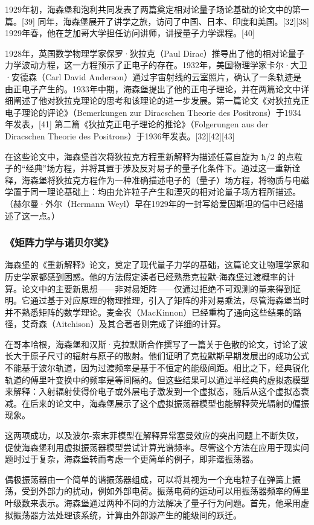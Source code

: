 1929年初，海森堡和泡利共同发表了两篇奠定相对论量子场论基础的论文中的第一篇。[39] 同年，海森堡展开了讲学之旅，访问了中国、日本、印度和美国。[32][38] 1929年春，他在芝加哥大学担任访问讲师，讲授量子力学课程。[40]  

1928年，英国数学物理学家保罗·狄拉克（Paul Dirac）推导出了他的相对论量子力学波动方程，这一方程预示了正电子的存在。1932年，美国物理学家卡尔·大卫·安德森（Carl David Anderson）通过宇宙射线的云室照片，确认了一条轨迹是由正电子产生的。1933年中期，海森堡提出了他的正电子理论，并在两篇论文中详细阐述了他对狄拉克理论的思考和该理论的进一步发展。第一篇论文《对狄拉克正电子理论的评论》（Bemerkungen zur Diracschen Theorie des Positrons）于1934年发表，[41] 第二篇《狄拉克正电子理论的推论》（Folgerungen aus der Diracschen Theorie des Positrons）于1936年发表。[32][42][43]  

在这些论文中，海森堡首次将狄拉克方程重新解释为描述任意自旋为 ħ/2 的点粒子的“经典”场方程，并将其置于涉及反对易子的量子化条件下。通过这一重新诠释，海森堡将狄拉克方程作为一种准确描述电子的（量子）场方程，将物质与电磁学置于同一理论基础上：均由允许粒子产生和湮灭的相对论量子场方程所描述。（赫尔曼·外尔（Hermann Weyl）早在1929年的一封写给爱因斯坦的信中已经描述了这一点。）
\subsubsection{《矩阵力学与诺贝尔奖》}
海森堡的《重新解释》论文，奠定了现代量子力学的基础，这篇论文让物理学家和历史学家都感到困惑。他的方法假定读者已经熟悉克拉默-海森堡过渡概率的计算。论文中的主要新思想——非对易矩阵——仅通过拒绝不可观测的量来得到证明。它通过基于对应原理的物理推理，引入了矩阵的非对易乘法，尽管海森堡当时并不熟悉矩阵的数学理论。麦金农（MacKinnon）已经重构了通向这些结果的路径，艾奇森（Aitchison）及其合著者则完成了详细的计算。

在哥本哈根，海森堡和汉斯·克拉默斯合作撰写了一篇关于色散的论文，讨论了波长大于原子尺寸的辐射与原子的散射。他们证明了克拉默斯早期发展出的成功公式不能基于波尔轨道，因为过渡频率是基于不恒定的能级间距。相比之下，经典锐化轨道的傅里叶变换中的频率是等间隔的。但这些结果可以通过半经典的虚拟态模型来解释：入射辐射使得价电子或外层电子激发到一个虚拟态，随后从这个虚拟态衰减。在后来的论文中，海森堡展示了这个虚拟振荡器模型也能解释荧光辐射的偏振现象。

这两项成功，以及波尔-索末菲模型在解释异常塞曼效应的突出问题上不断失败，促使海森堡利用虚拟振荡器模型尝试计算光谱频率。尽管这个方法在应用于现实问题时过于复杂，海森堡转而考虑一个更简单的例子，即非谐振荡器。

偶极振荡器由一个简单的谐振荡器组成，可以将其视为一个充电粒子在弹簧上振荡，受到外部力的扰动，例如外部电荷。振荡电荷的运动可以用振荡器频率的傅里叶级数来表示。海森堡通过两种不同的方法解决了量子行为问题。首先，他采用虚拟振荡器方法处理该系统，计算由外部源产生的能级间的跃迁。

